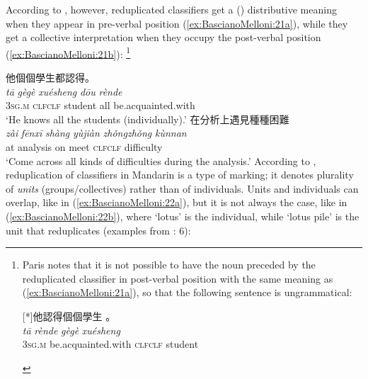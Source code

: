 \documentclass[output=paper]{langsci/langscibook}
\begin{document}
According to %
\citet[68]{Paris2007}%
%
, however, reduplicated classifiers get a
() distributive meaning when they appear in pre-verbal position
(\ref{ex:BascianoMelloni:21a}), while they get a  collective interpretation when they
occupy the post-verbal position (\ref{ex:BascianoMelloni:21b}):%
\footnote{Paris notes that it
  is not possible to have the noun preceded by the reduplicated
  classifier in post-verbal position with the same meaning as (\ref{ex:BascianoMelloni:21a}), so
  that the following sentence is ungrammatical:
\begin{exe}
  [*]{他認得個個學生 。\\
  \gll \emph{tā} \emph{rènde} \emph{gè\tld{}gè} \emph{xuésheng}\\
  3\textsc{sg.m} be.acquainted.with
  \textsc{clf}\emph{\tld{}}\textsc{clf} student\\}
\end{exe}}


\ea\label{ex:BascianoMelloni:21}
\ea\label{ex:BascianoMelloni:21a} 他個個學生都認得。\\
\gll \emph{tā} \emph{gè\tld{}gè} \emph{xuésheng} \emph{dōu} \emph{rènde}\\
3\textsc{sg.m} \textsc{clf}\emph{\tld{}}\textsc{clf} student all be.acquainted.with\\
\glt `He knows all the students (individually).'
\ex\label{ex:BascianoMelloni:21b} 在分析上遇見種種困難 \\
\gll \emph{zài} \emph{fēnxī} \emph{shàng} \emph{yùjiàn} \emph{zhǒng\tld{}zhǒng} \emph{kùnnan}\\
at analysis on meet \textsc{clf}\emph{\tld{}}\textsc{clf} difficulty\\
\glt `Come across all kinds of difficulties during the analysis.'
\z\z
According to %
\citet{Zhang2014}%
%
, reduplication of classifiers in Mandarin is a
type of  marking; it denotes plurality of \emph{units}
(groups/collectives) rather than of individuals. Units and individuals
can overlap, like in (\ref{ex:BascianoMelloni:22a}), but it is not always the case, like in
(\ref{ex:BascianoMelloni:22b}), where `lotus' is the individual, while `lotus pile' is the unit
that reduplicates (examples from %
\citealt{Zhang2014}: 6):

\largerpage 
\ea\label{ex:BascianoMelloni:22}

\end{document}
